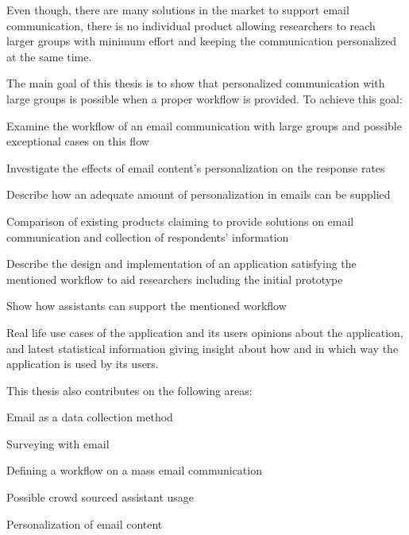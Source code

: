 Even though, there are many solutions in the market to support email communication, there is no individual product allowing researchers to reach larger groups with minimum effort and keeping the communication personalized at the same time.
\vspace{1cm}

The main goal of this thesis is to show that personalized communication with large groups is possible when a proper workflow is provided. To achieve this goal:

\begin{compactenum}
	\item Examine the workflow of an email communication with large groups and possible exceptional cases on this flow
	\item Investigate the effects of email content's personalization on the response rates
	\item Describe how an adequate amount of personalization in emails can be supplied
	\item Comparison of  existing products claiming to provide solutions on email communication and collection of respondents' information
	\item Describe the design and implementation of an application satisfying the mentioned workflow to aid researchers including the initial prototype
	\item Show how assistants can support the mentioned workflow  
	\item Real life use cases of the application and its users opinions about the application, and latest statistical information giving insight about how and in which way the application is used by its users.
\end{compactenum}
\vspace{1cm}

This thesis also contributes on the following areas:

\begin{compactenum}
	\item Email as a data collection method
	\item Surveying with email
	\item Defining a workflow on a mass email communication
	\item Possible crowd sourced assistant usage
	\item Personalization of email content
\end{compactenum}


